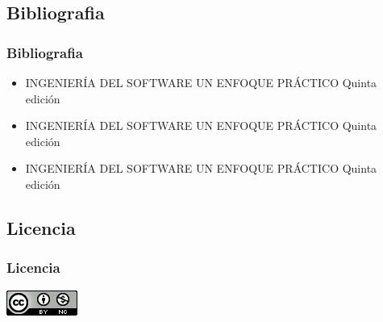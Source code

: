 \documentclass{beamer}
\begin{document}
\subsection{Bibliografia}
\begin{frame}
\frametitle{Bibliografia}
	\begin{itemize}
		\item INGENIERÍA DEL SOFTWARE UN ENFOQUE PRÁCTICO Quinta edición
		\item INGENIERÍA DEL SOFTWARE UN ENFOQUE PRÁCTICO Quinta edición
		\item INGENIERÍA DEL SOFTWARE UN ENFOQUE PRÁCTICO Quinta edición
	\end{itemize}
\end{frame}

\subsection{Licencia}
\begin{frame}
\frametitle{Licencia}
\begin{center}
\href{http://www.google.com}{\includegraphics[scale=.8]{cc}}
\end{center}
\end{frame}

\MuchasGraciasFrame
\end{document}
